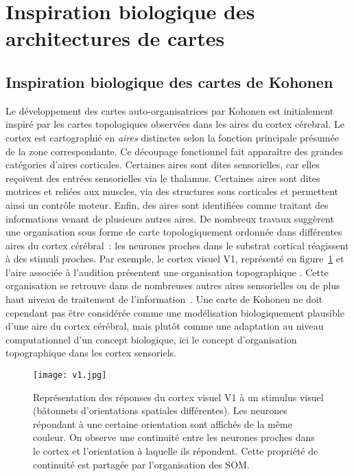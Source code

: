 \documentclass[../main]{subfiles}
\begin{document}
\section{Inspiration biologique des architectures de cartes}\label{sec:bioinspi}

\subsection{Inspiration biologique des cartes de Kohonen}

Le développement des cartes auto-organisatrices par Kohonen est initialement inspiré par les cartes topologiques observées dans les aires du cortex cérebral. 
Le cortex est cartographié en \emph{aires} distinctes selon la fonction principale présumée de la zone correspondante.
Ce découpage fonctionnel fait apparaître des grandes catégories d'aires corticales. 
Certaines aires sont dites sensorielles, car elles reçoivent des entrées sensorielles via le thalamus. Certaines aires sont dites motrices et reliées aux muscles, via des structures sous corticales et permettent ainsi un contrôle moteur.
Enfin, des aires sont identifiées comme traitant des informations venant de plusieurs autres aires.
De nombreux travaux suggèrent une organisation sous forme de carte topologiquement ordonnée dans différentes aires du cortex cérébral~: les neurones proches dans le substrat cortical réagissent à des stimuli proches. 
Par exemple, le cortex visuel V1, représenté en figure~\ref{fig:v1} et l'aire associée à l'audition présentent une organisation topographique \parencite{Reale1980TonotopicOI}. Cette organisation se retrouve dans de nombreuses autres aires sensorielles ou de plus haut niveau de traitement de l'information~\parencite{Kohonen1995SelfOrganizingM}. 
Une carte de Kohonen ne doit cependant pas être considérée comme une modélisation biologiquement plausible d'une aire du cortex cérébral, mais plutôt comme une adaptation au niveau computationnel d'un concept biologique, ici le concept d'organisation topographique dans les cortex sensoriels.

\begin{figure}
\centering
\texttt{[image: v1.jpg]}
\caption{Représentation des réponses du cortex visuel V1 à un stimulus visuel (bâtonnets d'orientations spatiales différentes). Les neurones répondant à une certaine orientation sont affichés de la même couleur. On observe une continuité entre les neurones proches dans le cortex et l'orientation à laquelle ils répondent. Cette propriété de continuité est partagée par l'organisation des SOM.\label{fig:v1}}
\end{figure}
\end{document}
